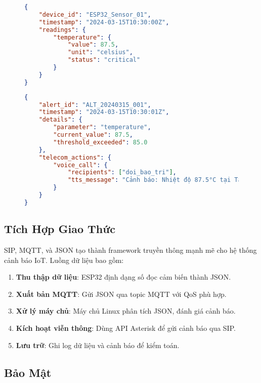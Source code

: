 \begin{figure}[htbp]
  \centering
  \begin{lstlisting}[language=json, caption=Dữ liệu Cảm Biến, label=lst:sensor_payload]
{
    "device_id": "ESP32_Sensor_01", 
    "timestamp": "2024-03-15T10:30:00Z",
    "readings": {
        "temperature": {
            "value": 87.5,         
            "unit": "celsius",
            "status": "critical"
        }
    }
}
  \end{lstlisting}
\end{figure}

\begin{figure}[htbp]
  \centering
  \begin{lstlisting}[language=json, caption=Cảnh báo, label=lst:alert_payload]
{
    "alert_id": "ALT_20240315_001", 
    "timestamp": "2024-03-15T10:30:01Z",
    "details": {
        "parameter": "temperature",
        "current_value": 87.5,
        "threshold_exceeded": 85.0
    },
    "telecom_actions": {
        "voice_call": {
            "recipients": ["doi_bao_tri"],
            "tts_message": "Cảnh báo: Nhiệt độ 87.5°C tại Tầng Máy A"
        }
    }
}
  \end{lstlisting}
\end{figure}
\subsection{Tích Hợp Giao Thức}
\label{subsec:protocol_integration}

SIP, MQTT, và JSON tạo thành framework truyền thông mạnh mẽ cho hệ thống cảnh báo IoT. Luồng dữ liệu bao gồm:

\begin{enumerate}
    \item \textbf{Thu thập dữ liệu}: ESP32 định dạng số đọc cảm biến thành JSON.
    \item \textbf{Xuất bản MQTT}: Gửi JSON qua topic MQTT với QoS phù hợp.
    \item \textbf{Xử lý máy chủ}: Máy chủ Linux phân tích JSON, đánh giá cảnh báo.
    \item \textbf{Kích hoạt viễn thông}: Dùng API Asterisk để gửi cảnh báo qua SIP.
    \item \textbf{Lưu trữ}: Ghi log dữ liệu và cảnh báo để kiểm toán.
\end{enumerate}

\subsection{Bảo Mật}
\label{subsec:protocol_security}

